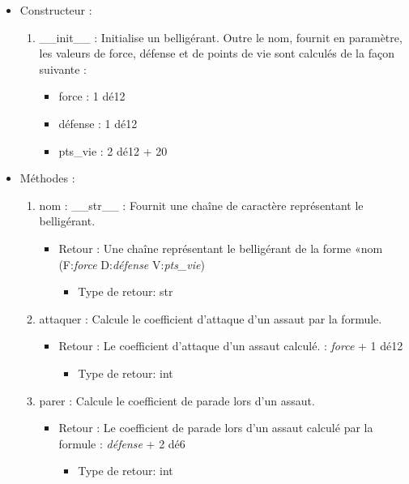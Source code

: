 \documentclass[12pt,pdftex,oneside]{article}
\begin{document}
\begin{itemize}
\begin{enumerate}
    \end{enumerate}

  \item Constructeur : 

    \begin{enumerate}
    \item \_\_init\_\_ : Initialise un belligérant. Outre le nom, fournit en
paramètre, les valeurs de force, défense et de points de vie sont calculés de la
façon suivante :
        \begin{itemize}
          \item force : 1 dé12
          \item défense : 1 dé12
          \item pts\_vie : 2 dé12 + 20
        \end{itemize}
    \end{enumerate}

  \item Méthodes : 

    \begin{enumerate}
    \item nom : \_\_str\_\_ : Fournit une chaîne de caractère représentant le belligérant.
      \begin{itemize}
      \item Retour : Une chaîne représentant le belligérant de la forme «nom
        (F:\emph{force} D:\emph{défense} V:\emph{pts\_vie})
          \begin{itemize}
          \item Type de retour: str
          \end{itemize}
      \end{itemize}

    \item attaquer : Calcule le coefficient d'attaque d'un assaut  par la formule.
      \begin{itemize}
      \item Retour : Le coefficient d'attaque d'un assaut calculé.
        : \emph{force} + 1 dé12
          \begin{itemize}
          \item Type de retour: int
          \end{itemize}
      \end{itemize}

    \item parer : Calcule le coefficient de parade lors d'un assaut.
      \begin{itemize}
      \item Retour : Le coefficient de parade lors d'un assaut calculé par la
        formule : \emph{défense} + 2 dé6
          \begin{itemize}
          \item Type de retour: int
          \end{itemize}
      \end{itemize}


\end{enumerate}
\end{itemize}
\end{document}
